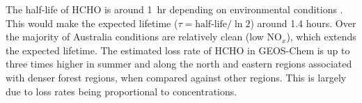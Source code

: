       
      
      The half-life of HCHO %
      is around 1~hr depending on environmental conditions \parencite{WHO_hcho_guidelines_2010}.
      This would make the expected lifetime ($\tau = \text{half-life}/\ln{2}$) around 1.4 hours.
      Over the majority of Australia conditions are relatively clean (low NO$_x$), which extends the expected lifetime.
      The estimated loss rate of HCHO in GEOS-Chem %
      is up to three times higher in summer and along the north and eastern regions associated with denser forest regions, when compared against other regions.
      This is largely due to loss rates being proportional to concentrations.
      
      
      
